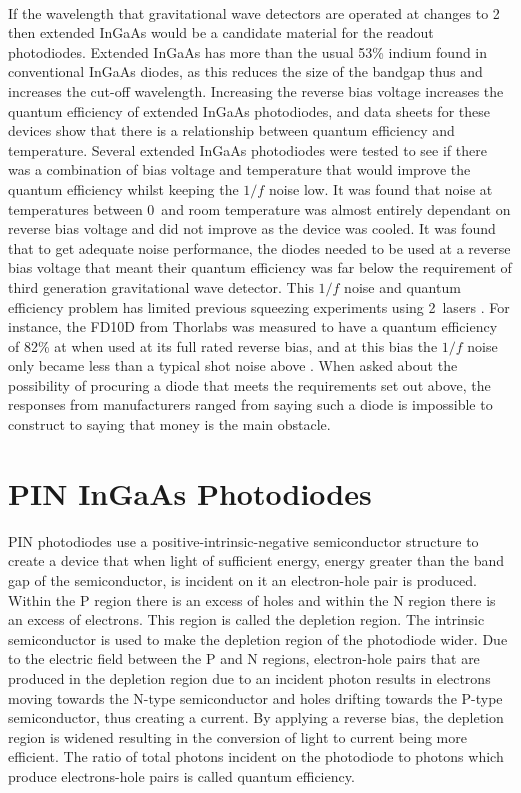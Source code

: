 \paragraph{}
If the wavelength that gravitational wave detectors are operated at changes to 2\,\SIunits{\micro\meter} then extended InGaAs would be a candidate material for the readout photodiodes. Extended InGaAs has more than the usual 53\% indium found in conventional InGaAs diodes, as this reduces the size of the bandgap thus and increases the cut-off wavelength. Increasing the reverse bias voltage increases the quantum efficiency of extended InGaAs photodiodes, and data sheets for these devices show that there is a relationship between quantum efficiency and temperature. Several extended InGaAs photodiodes were tested to see if there was a combination of bias voltage and temperature that would improve the quantum efficiency whilst keeping the $1/f$ noise low. It was found that noise at temperatures between 0\, and room temperature was almost entirely dependant on reverse bias voltage and did not improve as the device was cooled. It was found that to get adequate noise performance, the diodes needed to be used at a reverse bias voltage that meant their quantum efficiency was far below the requirement of  third generation gravitational wave detector. This $1/f$ noise and quantum efficiency problem has limited previous squeezing experiments using 2\,\SIunits{\micro\meter} lasers \cite{Mansell2018a}. For instance, the FD10D from Thorlabs was measured to have a quantum efficiency of 82\% at  when used at its full rated reverse bias, and at this bias the $1/f$ noise only became less than a typical shot noise above .  When asked about the possibility of procuring a diode that meets the requirements set out above, the responses from manufacturers ranged from saying such a diode is impossible to construct to saying that money is the main obstacle.
\section{PIN InGaAs Photodiodes}
PIN photodiodes use a positive-intrinsic-negative semiconductor structure to create a device that when light of sufficient energy, energy greater than the band gap of the semiconductor, is incident on it an electron-hole pair is produced. Within the P region there is an excess of holes and within the N region there is an excess of electrons. This region is called the depletion region. The intrinsic semiconductor is used to make the depletion region of the photodiode wider. Due to the electric field between the P and N regions, electron-hole pairs that are produced in the depletion region due to an incident photon results in electrons moving towards the N-type semiconductor and holes drifting towards the P-type semiconductor, thus creating a current. By applying a reverse bias, the depletion region is widened resulting in the conversion of light to current being more efficient. The ratio of total photons incident on the photodiode to photons which produce electrons-hole pairs is called quantum efficiency.

